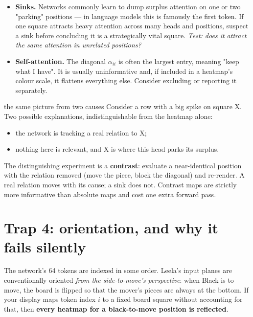 \begin{itemize}
\item \textbf{Sinks.} Networks commonly learn to dump surplus attention on one or two
  "parking" positions --- in language models this is famously the first token. If one square
  attracts heavy attention across many heads and positions, suspect a sink before concluding
  it is a strategically vital square. \emph{Test: does it attract the same attention in
  unrelated positions?}
\item \textbf{Self-attention.} The diagonal $\alpha_{ii}$ is often the largest entry, meaning
  "keep what I have". It is usually uninformative and, if included in a heatmap's colour
  scale, it flattens everything else. Consider excluding or reporting it separately.
\end{itemize}

\begin{worked}{the same picture from two causes}
Consider a row with a big spike on square X. Two possible explanations, indistinguishable
from the heatmap alone:
\begin{itemize}
\item the network is tracking a real relation to X;
\item nothing here is relevant, and X is where this head parks its surplus.
\end{itemize}
The distinguishing experiment is a \textbf{contrast}: evaluate a near-identical position with
the relation removed (move the piece, block the diagonal) and re-render. A real relation moves
with its cause; a sink does not. Contrast maps are strictly more informative than absolute
maps and cost one extra forward pass.
\end{worked}

\section{Trap 4: orientation, and why it fails silently}

The network's 64 tokens are indexed in some order. Leela's input planes are conventionally
oriented \emph{from the side-to-move's perspective}: when Black is to move, the board is
flipped so that the mover's pieces are always at the bottom. If your display maps token index
$i$ to a fixed board square without accounting for that, then \textbf{every heatmap for a
black-to-move position is reflected}.

